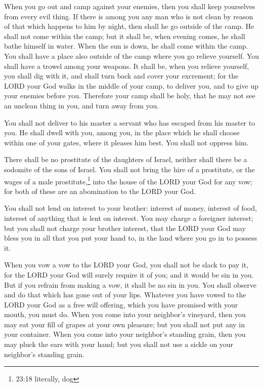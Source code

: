 \myverse{}When you go out and camp against your enemies, then you shall
keep yourselves from every evil thing.
\myverse{}If there is among you any man who is not clean by reason of that which happens
to him by night, then shall he go outside of the camp. He shall not come within the camp;
\myverse{}but it shall be, when evening comes, he shall bathe himself in water. When
the sun is down, he shall come within the camp.
\myverse{}You shall have a place also outside of the camp where you go relieve yourself.
\myverse{}You shall have a trowel among your weapons. It shall be, when you relieve
yourself, you shall dig with it, and shall turn back and cover your excrement;
\myverse{}for the LORD your God walks in the middle of your camp, to deliver you, and
to give up your enemies before you. Therefore your camp shall be holy, that he may not see an unclean
thing in you, and turn away from you.

\myverse{}You shall not deliver to his master a servant who has escaped
from his master to you.
\myverse{}He shall dwell with you, among you, in the place which he shall choose within
one of your gates, where it pleases him best. You shall not oppress him.

\myverse{}There shall be no prostitute of the daughters of Israel, neither
shall there be a sodomite of the sons of Israel.
\myverse{}You shall not bring the hire of a prostitute, or the wages of a male prostitute,\footnote{23:18 literally, dog} into the house of the LORD your God for any vow; for both of these are
an abomination to the LORD your God.

\myverse{}You shall not lend on interest to your brother: interest of
money, interest of food, interest of anything that is lent on interest.
\myverse{}You may charge a foreigner interest; but you shall not charge your brother
interest, that the LORD your God may bless you in all that you put your hand to, in the land where you
go in to possess it.

\myverse{}When you vow a vow to the LORD your God, you shall not be slack
to pay it, for the LORD your God will surely require it of you; and it would be sin in you.
\myverse{}But if you refrain from making a vow, it shall be no sin in you.
\myverse{}You shall observe and do that which has gone out of your lips. Whatever you
have vowed to the LORD your God as a free will offering, which you have promised with your mouth, you
must do.
\myverse{}When you come into your neighbor’s vineyard, then you may eat your fill of
grapes at your own pleasure; but you shall not put any in your container.
\myverse{}When you come into your neighbor’s standing grain, then you may pluck the
ears with your hand; but you shall not use a sickle on your neighbor’s standing grain.


